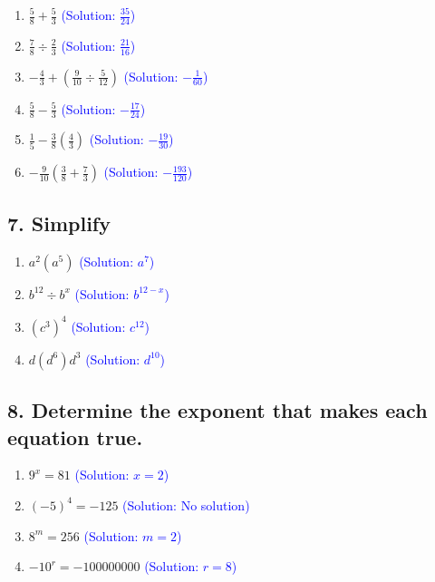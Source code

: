 \documentclass{article}
\begin{document}
\begin{enumerate}
    \item $\frac{5}{8}+\frac{5}{3}$ \textcolor{blue}{(Solution: $\frac{35}{24}$)}
    \item $\frac{7}{8} \div \frac{2}{3}$ \textcolor{blue}{(Solution: $\frac{21}{16}$)}
    \item $-\frac{4}{3}+\left(\frac{9}{10} \div \frac{5}{12}\right)$ \textcolor{blue}{(Solution: $-\frac{1}{60}$)}
    \item $\frac{5}{8}-\frac{5}{3}$ \textcolor{blue}{(Solution: $-\frac{17}{24}$)}
    \item $\frac{1}{5}-\frac{3}{8}\left(\frac{4}{3}\right)$ \textcolor{blue}{(Solution: $-\frac{19}{30}$)}
    \item $-\frac{9}{10}\left(\frac{3}{8}+\frac{7}{3}\right)$ \textcolor{blue}{(Solution: $-\frac{193}{120}$)}
\end{enumerate}

\subsection*{7. Simplify}

\begin{enumerate}
    \item $a^2\left(a^5\right)$ \textcolor{blue}{(Solution: $a^7$)}
    \item $b^{12} \div b^x$ \textcolor{blue}{(Solution: $b^{12-x}$)}
    \item $\left(c^3\right)^4$ \textcolor{blue}{(Solution: $c^{12}$)}
    \item $d\left(d^6\right) d^3$ \textcolor{blue}{(Solution: $d^{10}$)}
\end{enumerate}

\subsection*{8. Determine the exponent that makes each equation true.}

\begin{enumerate}
    \item $9^x=81$ \textcolor{blue}{(Solution: $x=2$)}
    \item $(-5)^4=-125$ \textcolor{blue}{(Solution: No solution)}
    \item $8^m=256$ \textcolor{blue}{(Solution: $m=2$)}
    \item $-10^r=-100000000$ \textcolor{blue}{(Solution: $r=8$)}
\end{enumerate}
\end{document}
